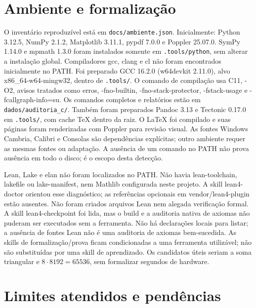\documentclass[
  brazilian,
  11pt,
  a4paper,
]{article}
\let\oldsection\section
\renewcommand{\section}{\Needspace{6\baselineskip}\oldsection}
\begin{document}
\section{Ambiente e formalização}\label{ambiente-e-formalizauxe7uxe3o}

O inventário reproduzível está em
\texttt{docs/\allowbreak{}ambiente.\allowbreak{}json}. Inicialmente:
Python 3.12.5, NumPy 2.1.2, Matplotlib 3.11.1, pypdf 7.0.0 e Poppler
25.07.0. SymPy 1.14.0 e mpmath 1.3.0 foram instalados somente em
\texttt{.\allowbreak{}tools/\allowbreak{}python}, sem alterar a
instalação global. Compiladores gcc, clang e cl não foram encontrados
inicialmente no PATH. Foi preparado GCC 16.2.0 (w64devkit 2.11.0), alvo
x86\_64-w64-mingw32, dentro de
\texttt{.\allowbreak{}tools/\allowbreak{}}. O comando de compilação usa
C11, -O2, avisos tratados como erros, -fno-builtin,
-fno-stack-protector, -fstack-usage e -fcallgraph-info=su. Os comandos
completos e relatórios estão em
\texttt{dados/\allowbreak{}auditoria\_\allowbreak{}c/\allowbreak{}}.
Também foram preparados Pandoc 3.13 e Tectonic 0.17.0 em
\texttt{.\allowbreak{}tools/\allowbreak{}}, com cache TeX dentro da
raiz. O LaTeX foi compilado e suas páginas foram renderizadas com
Poppler para revisão visual. As fontes Windows Cambria, Calibri e
Consolas são dependências explícitas; outro ambiente requer as mesmas
fontes ou adaptação. A ausência de um comando no PATH não prova ausência
em todo o disco; é o escopo desta detecção.

Lean, Lake e elan não foram localizados no PATH. Não havia
lean-toolchain, lakefile ou lake-manifest, nem Mathlib configurada neste
projeto. A skill lean4-doctor orientou esse diagnóstico; as referências
opcionais em vendor/lean4-plugin estão ausentes. Não foram criados
arquivos Lean nem alegada verificação formal. A skill lean4-checkpoint
foi lida, mas o build e a auditoria nativa de axiomas não puderam ser
executados sem a ferramenta. Não há declarações locais para listar; a
ausência de fontes Lean não é uma auditoria de axiomas bem-sucedida. As
skills de formalização/prova ficam condicionadas a uma ferramenta
utilizável; não são substituídas por uma skill de aprendizado. Os
candidatos úteis seriam a soma triangular e \(8\cdot8192=65536\), sem
formalizar segundos de hardware.

\section{Limites atendidos e
pendências}\label{limites-atendidos-e-penduxeancias}
\end{document}
